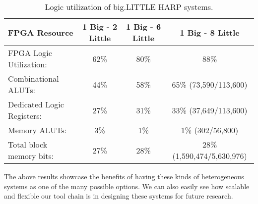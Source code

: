 \begin{table}[!htbp]
  \centering
  \caption{Logic utilization of big.LITTLE HARP systems.}
  \begin{tabular}{|l|c|c|c|}
    \hline
FPGA Resource					& 1 Big - 2 Little	&1 Big - 6 Little		&1 Big - 8 Little\\
    \hline
FPGA Logic Utilization:		& 62\% 				& 80\% 				& 88\% \\
   Combinational ALUTs:		& 44\% 				& 58\%				& 65\% (73,590/113,600)\\
   Dedicated Logic Registers:	& 27\%			& 31\%				&33\% (37,649/113,600)\\
   Memory ALUTs:				& 3\%					& 1\%					& 1\% (302/56,800)\\
Total block memory bits:	& 27\%				& 28\%				& 28\% (1,590,474/5,630,976)\\
    \hline
  \end{tabular}
  \label{table:fpga_util4}
\end{table}

The above results showcase the benefits of having these kinds of heterogeneous systems as one of the many possible options. We can also easily see how scalable and flexible our tool chain is in designing these systems for future research. 
